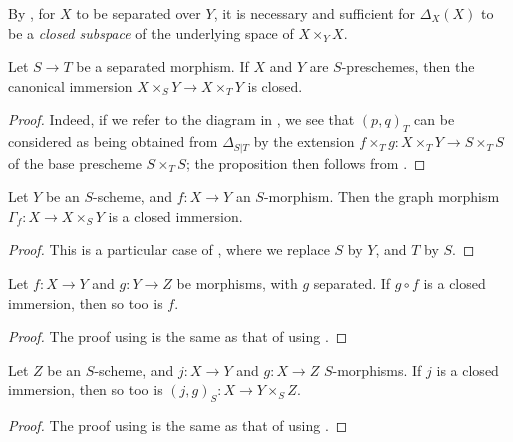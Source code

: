 By , for $X$ to be separated over $Y$, it is necessary and sufficient for $\Delta_X(X)$ to be a \emph{closed subspace} of the underlying space of $X\times_Y X$.

\begin{proposition}[5.4.2]
\label{I.5.4.2}
Let $S\to T$ be a separated morphism.
If $X$ and $Y$ are $S$-preschemes, then the canonical immersion $X\times_S Y\to X\times_T Y$  is closed.
\end{proposition}

\begin{proof}
Indeed, if we refer to the diagram in , we see that $(p,q)_T$ can be considered as being obtained from $\Delta_{S|T}$ by the extension $f\times_T g:X\times_T Y\to S\times_T S$ of the base prescheme $S\times_T S$;
the proposition then follows from .
\end{proof}

\begin{corollary}[5.4.3]
\label{I.5.4.3}
Let $Y$ be an $S$-scheme, and $f:X\to Y$ an $S$-morphism.
Then the graph morphism $\Gamma_f:X\to X\times_S Y$  is a closed immersion.
\end{corollary}

\begin{proof}
This is a particular case of , where we replace $S$ by $Y$, and $T$ by $S$.
\end{proof}

\begin{corollary}[5.4.4]
\label{I.5.4.4}
Let $f:X\to Y$ and $g:Y\to Z$ be morphisms, with $g$ separated.
If $g\circ f$ is a closed immersion, then so too is $f$.
\end{corollary}

\begin{proof}
The proof using  is the same as that of  using .
\end{proof}

\begin{corollary}[5.4.5]
\label{I.5.4.5}
Let $Z$ be an $S$-scheme, and $j:X\to Y$ and $g:X\to Z$ $S$-morphisms.
If $j$ is a closed immersion, then so too is $(j,g)_S:X\to Y\times_S Z$.
\end{corollary}

\begin{proof}
The proof using  is the same as that of  using .
\end{proof}

